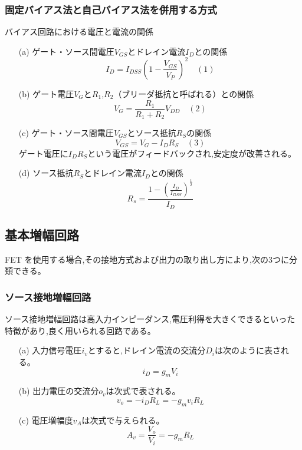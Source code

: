 \documentclass[a4paper,11pt,xelatex,ja=standard]{bxjsarticle}
\begin{document}
        \subsubsection{固定バイアス法と自己バイアス法を併用する方式}
            バイアス回路における電圧と電流の関係

            \begin{enumerate}
                \item[(a)] ゲート・ソース間電圧\( V_{GS} \)とドレイン電流\( I_D \)との関係
                \[ I_D = I_{DSS} \left( 1 - \frac{V_{GS}}{V_P} \right)^2 \quad (1) \]
            
                \item[(b)] ゲート電圧\( V_G \)と\( R_1 \),\( R_2 \)（ブリーダ抵抗と呼ばれる）との関係
                \[ V_G = \frac{R_1}{R_1 + R_2} V_{DD} \quad (2) \]
            
                \item[(c)] ゲート・ソース間電圧\( V_{GS} \)とソース抵抗\( R_S \)の関係
                \[ V_{GS} = V_G - I_D R_S \quad (3) \]
                ゲート電圧に\( I_D R_S \)という電圧がフィードバックされ,安定度が改善される。
            
                \item[(d)] ソース抵抗\( R_S \)とドレイン電流\( I_D \)との関係
                \[ R_s = \frac{1 - \left( \frac{I_D}{I_{DSS}} \right) ^{\frac{1}{2}}}{I_D} \]

            \end{enumerate}
    \subsection{基本増幅回路}
        FET を使用する場合,その接地方式および出力の取り出し方により,次の3つに分類できる。
        \subsubsection{ソース接地増幅回路}
            ソース接地増幅回路は高入力インピーダンス,電圧利得を大きくできるといった特徴があり,良く用いられる回路である。
            \begin{enumerate}
                \item[(a)] 入力信号電圧$i_v$とすると,ドレイン電流の交流分$D_i$は次のように表される。
                    \[ i_D = g_m V_i \]
                \item[(b)] 出力電圧の交流分$o_v$は次式で表される。
                    \[ v_o = - i_D R_L = - g_m v_i R_L \]
                \item[(c)] 電圧増幅度$v_A$は次式で与えられる。
                    \[ A_v = \frac{V_o}{V_i} = - g_m R_L \]
            \end{enumerate}
\end{document}
